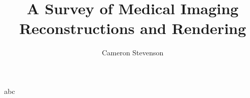 \documentclass{acmart}
\title{A Survey of Medical Imaging Reconstructions and Rendering}
\author{Cameron Stevenson}
\begin{document}
\maketitle

abc \cite{mackay2019robust}



\end{document}
